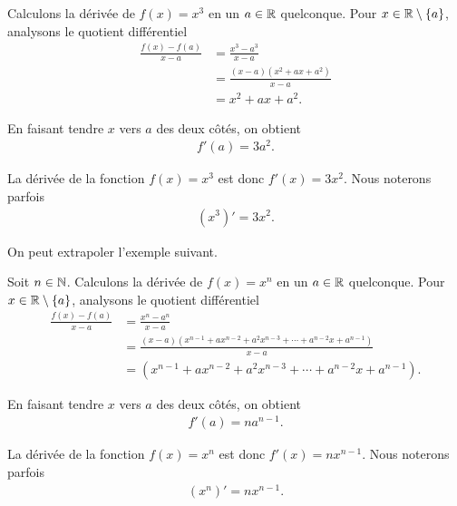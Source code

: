 \documentclass[main.tex]{subfiles}
\begin{document}
\begin{example}
    [Dérivée de $x^3$]

    Calculons la dérivée de $f(x) = x^3$ en un $a \in \mathbb{R}$ quelconque.
    Pour $x \in \mathbb{R} \setminus \{a\}$,
    analysons le quotient différentiel
    \begin{align}
        \frac {f(x) - f(a)}{x - a}
        &= \frac {x^3 - a^3}{x - a}\\
        &= \frac {(x-a)(x^2 + ax + a^2)}{x - a}\\
        &= x^2 + ax + a^2.
    \end{align}

    En faisant tendre $x$ vers $a$ des deux côtés,
    on obtient
    \begin{align}
        f'(a) = 3a^2.
    \end{align}
    
    La dérivée de la fonction $f(x) = x^3$ est donc $f'(x) = 3x^2$.
    Nous noterons parfois
    \begin{align}
        (x^3)'=3x^2.
    \end{align}
\end{example}

On peut extrapoler l'exemple suivant.

\begin{example}
    [Dérivée de $x^n$]

    Soit $n \in \mathbb{N}$.
    Calculons la dérivée de $f(x) = x^n$ en un $a \in \mathbb{R}$ quelconque.
    Pour $x \in \mathbb{R} \setminus \{a\}$,
    analysons le quotient différentiel
    \begin{align}
        \frac {f(x) - f(a)}{x - a}
        &= \frac {x^n - a^n}{x - a}\\
        &= \frac {(x-a)(x^{n-1} + ax^{n-2} + a^2x^{n-3} + \cdots + a^{n-2}x + a^{n-1})}{x - a}\\
        &= (x^{n-1} + ax^{n-2} + a^2x^{n-3} + \cdots + a^{n-2}x + a^{n-1}).
    \end{align}

    En faisant tendre $x$ vers $a$ des deux côtés,
    on obtient
    \begin{align}
        f'(a) = na^{n-1}.
    \end{align}
    
    La dérivée de la fonction $f(x) = x^n$ est donc $f'(x) = n x^{n-1}$.
    Nous noterons parfois
    \begin{align}
        (x^n)'=n x^{n-1}.
    \end{align}
\end{example}
\end{document}
